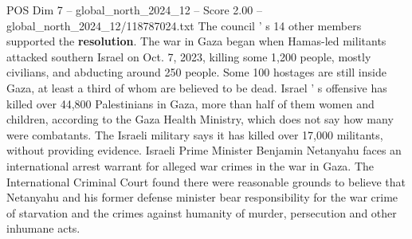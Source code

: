 \begin{textsample}{POS Dim 7 – global\_north\_2024\_12 – Score 2.00 – global\_north\_2024\_12/118787024.txt}
The council ' s 14 other members supported the \textbf{resolution}.
The war in Gaza began when Hamas-led militants attacked southern Israel on Oct. 7, 2023, killing some 1,200 people, mostly civilians, and abducting around 250 people.
Some 100 hostages are still inside Gaza, at least a third of whom are believed to be dead.
Israel ' s offensive has killed over 44,800 Palestinians in Gaza, more than half of them women and children, according to the Gaza Health Ministry, which does not say how many were combatants.
The Israeli military says it has killed over 17,000 militants, without providing evidence.
Israeli Prime Minister Benjamin Netanyahu faces an international arrest warrant for alleged war crimes in the war in Gaza.
The International Criminal Court found there were reasonable grounds to believe that Netanyahu and his former defense minister bear responsibility for the war crime of starvation and the crimes against humanity of murder, persecution and other inhumane acts.

\end{textsample}
